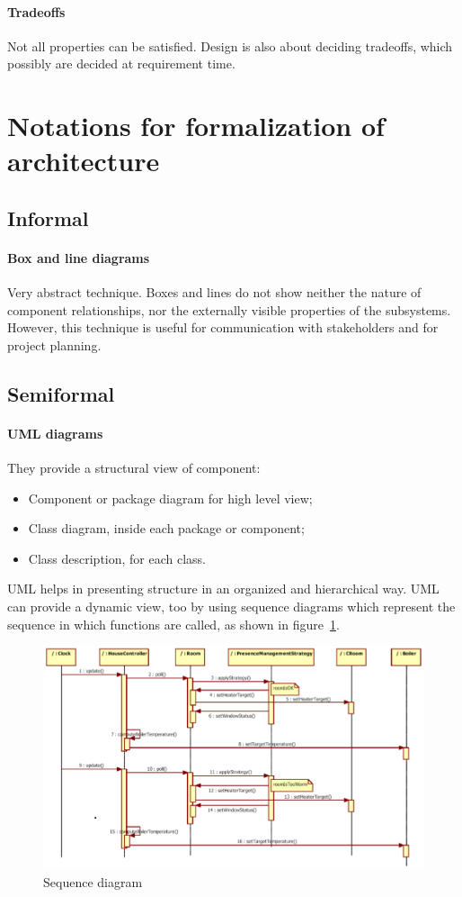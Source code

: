 \paragraph{Tradeoffs}
Not all properties can be satisfied. Design is also about deciding tradeoffs, which possibly are decided at requirement time.

\section{Notations for formalization of architecture}
\subsection{Informal}
\paragraph{Box and line diagrams}
Very abstract technique. Boxes and lines do not show neither the nature of component relationships, nor the externally visible properties of the subsystems. However, this technique is useful for communication with stakeholders and for project planning.

\subsection{Semiformal}
\paragraph{UML diagrams}
They provide a structural view of component:
\begin{itemize}
\item Component or package diagram for high level view;
\item Class diagram, inside each package or component;
\item Class description, for each class.
\end{itemize}
UML helps in presenting structure in an organized and hierarchical way. UML can provide a dynamic view, too by using sequence diagrams which represent the sequence in which functions are called, as shown in figure~\ref{sequence_diagram}.

\begin{figure}[hbtp]
\centering
\includegraphics[scale=0.55]{images/uml_sequence_diagram.png}
\caption{Sequence diagram}
\label{sequence_diagram}
\end{figure}

